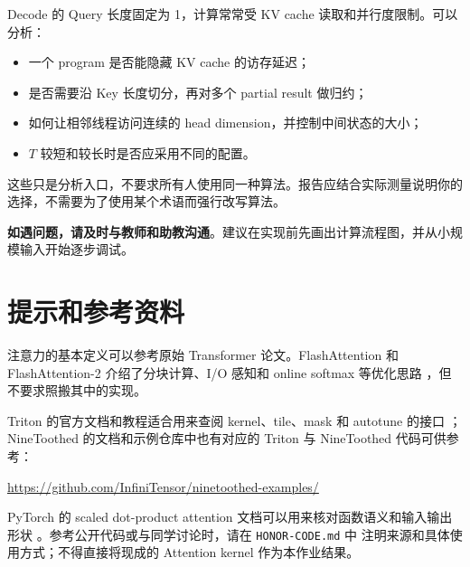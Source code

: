 \documentclass{article}
\begin{document}
Decode 的 Query 长度固定为 1，计算常常受 KV cache 读取和并行度限制。可以分析：
\begin{itemize}[leftmargin=2.5em]
  \item 一个 program 是否能隐藏 KV cache 的访存延迟；
  \item 是否需要沿 Key 长度切分，再对多个 partial result 做归约；
  \item 如何让相邻线程访问连续的 head dimension，并控制中间状态的大小；
  \item $T$ 较短和较长时是否应采用不同的配置。
\end{itemize}

这些只是分析入口，不要求所有人使用同一种算法。报告应结合实际测量说明你的
选择，不需要为了使用某个术语而强行改写算法。

\textbf{如遇问题，请及时与教师和助教沟通}。建议在实现前先画出计算流程图，并从小规模输入开始逐步调试。

\section{提示和参考资料}

注意力的基本定义可以参考原始 Transformer 论文\cite{vaswani2017attention}。FlashAttention 和
FlashAttention-2 介绍了分块计算、I/O 感知和 online softmax 等优化思路
\cite{dao2022flashattention,dao2023flashattention2}，但不要求照搬其中的实现。

Triton 的官方文档和教程适合用来查阅 kernel、tile、mask 和 autotune 的接口
\cite{triton2024}；NineToothed 的文档和示例仓库中也有对应的 Triton 与 NineToothed
代码可供参考\cite{ninetoothed2026}：
\begin{center}
\url{https://github.com/InfiniTensor/ninetoothed-examples/}
\end{center}

PyTorch 的 scaled dot-product attention 文档可以用来核对函数语义和输入输出形状
\cite{pytorchsdpa}。参考公开代码或与同学讨论时，请在 \texttt{HONOR-CODE.md} 中
注明来源和具体使用方式；不得直接将现成的 Attention kernel 作为本作业结果。




\end{document}
